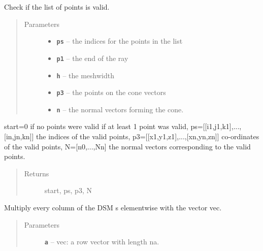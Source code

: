 \documentclass[letterpaper,10pt,english]{sphinxmanual}
\begin{document}
\begin{fulllineitems}
\begin{fulllineitems}
\label{index:DictionarySparseMatrix.DS.stopchecklist}
Check if the list of points is valid.
\begin{quote}\begin{description}
\item[{Parameters}] \leavevmode\begin{itemize}
\item {} 
\textbf{\texttt{ps}} -- the indices for the points in the list

\item {} 
\textbf{\texttt{p1}} -- the end of the ray

\item {} 
\textbf{\texttt{h}} -- the meshwidth

\item {} 
\textbf{\texttt{p3}} -- the points on the cone vectors

\item {} 
\textbf{\texttt{n}} -- the normal vectors forming the cone.

\end{itemize}

\end{description}\end{quote}

start=0 if no points were valid if at least 1 point was valid,
ps={[}{[}i1,j1,k1{]},...,{[}in,jn,kn{]}{]} the indices of the valid points,
p3={[}{[}x1,y1,z1{]},...,{[}xn,yn,zn{]}{]} co-ordinates of the valid points,
N={[}n0,...,Nn{]} the normal vectors corresponding to the valid points.
\begin{quote}\begin{description}
\item[{Returns}] \leavevmode
start, ps, p3, N

\end{description}\end{quote}

\end{fulllineitems}


\begin{fulllineitems}
\label{index:DictionarySparseMatrix.DS.vec_multiply}
Multiply every column of the DSM s elementwise with the
vector vec.
\begin{quote}\begin{description}
\item[{Parameters}] \leavevmode
\textbf{\texttt{a}} -- vec: a row vector with length na.


\end{description}
\end{quote}
\end{fulllineitems}
\end{fulllineitems}
\end{document}
